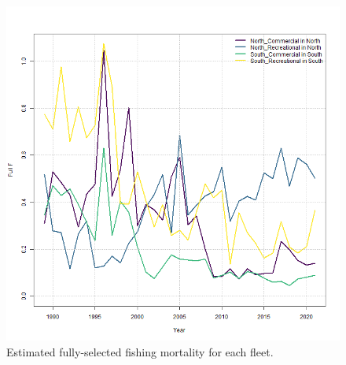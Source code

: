 \documentclass[
]{article}
\begin{document}
\begin{figure}

{\centering \includegraphics[width=1\linewidth]{../2023.RT.Runs/Run34/plots_png/results/F_byfleet} 

}

\caption{Estimated fully-selected fishing mortality for each fleet.}\label{fig:F-by-fleet}
\end{figure}
\end{document}
